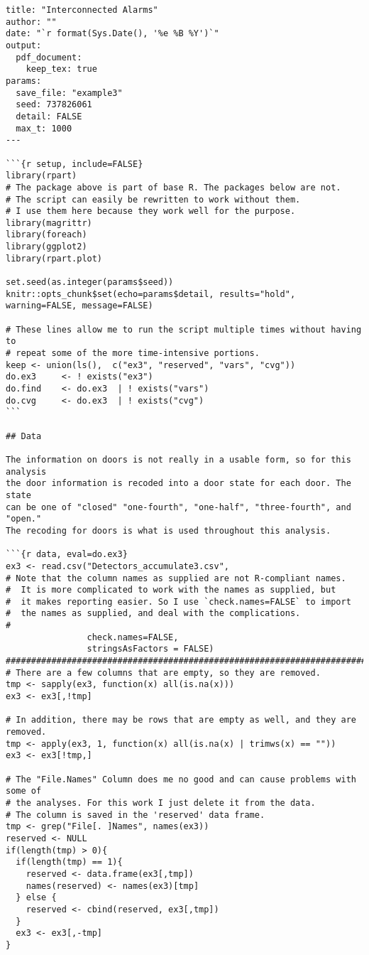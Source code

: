 \begin{lstlisting}[basicstyle=\scriptsize]
title: "Interconnected Alarms"
author: ""
date: "`r format(Sys.Date(), '%e %B %Y')`"
output:
  pdf_document:
    keep_tex: true
params:
  save_file: "example3"
  seed: 737826061
  detail: FALSE
  max_t: 1000
---

```{r setup, include=FALSE}
library(rpart)
# The package above is part of base R. The packages below are not.
# The script can easily be rewritten to work without them.
# I use them here because they work well for the purpose.
library(magrittr)
library(foreach)
library(ggplot2)
library(rpart.plot)

set.seed(as.integer(params$seed))
knitr::opts_chunk$set(echo=params$detail, results="hold", warning=FALSE, message=FALSE)

# These lines allow me to run the script multiple times without having to
# repeat some of the more time-intensive portions.
keep <- union(ls(),  c("ex3", "reserved", "vars", "cvg"))
do.ex3     <- ! exists("ex3")
do.find    <- do.ex3  | ! exists("vars")
do.cvg     <- do.ex3  | ! exists("cvg")
```

## Data

The information on doors is not really in a usable form, so for this analysis
the door information is recoded into a door state for each door. The state
can be one of "closed" "one-fourth", "one-half", "three-fourth", and "open."
The recoding for doors is what is used throughout this analysis.

```{r data, eval=do.ex3}
ex3 <- read.csv("Detectors_accumulate3.csv",
# Note that the column names as supplied are not R-compliant names.
#  It is more complicated to work with the names as supplied, but
#  it makes reporting easier. So I use `check.names=FALSE` to import
#  the names as supplied, and deal with the complications.
#
                check.names=FALSE,
                stringsAsFactors = FALSE)
#######################################################################
# There are a few columns that are empty, so they are removed.
tmp <- sapply(ex3, function(x) all(is.na(x)))
ex3 <- ex3[,!tmp]

# In addition, there may be rows that are empty as well, and they are removed.
tmp <- apply(ex3, 1, function(x) all(is.na(x) | trimws(x) == ""))
ex3 <- ex3[!tmp,]

# The "File.Names" Column does me no good and can cause problems with some of
# the analyses. For this work I just delete it from the data.
# The column is saved in the 'reserved' data frame.
tmp <- grep("File[. ]Names", names(ex3))
reserved <- NULL
if(length(tmp) > 0){
  if(length(tmp) == 1){
    reserved <- data.frame(ex3[,tmp])
    names(reserved) <- names(ex3)[tmp]
  } else {
    reserved <- cbind(reserved, ex3[,tmp])
  }
  ex3 <- ex3[,-tmp]
}


\end{lstlisting}
